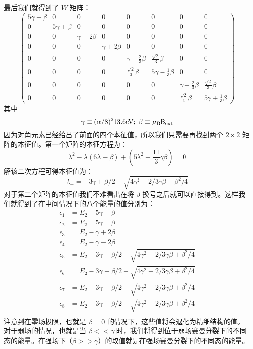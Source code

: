 最后我们就得到了 $W$ 矩阵：
\begin{equation}
\begin{pmatrix}
5\gamma -\beta & 0 & 0 & 0 & 0 & 0 & 0 & 0\\
 0 & 5\gamma +\beta  & 0 & 0 & 0 & 0 & 0 & 0\\
 0 & 0 & \gamma-2\beta & 0 & 0 & 0 & 0 & 0\\
 0 & 0 & 0 & \gamma+2\beta & 0 & 0 & 0 & 0\\
 0 & 0 & 0 & 0 & \gamma-\frac{2}{3}\beta & \frac{\sqrt{2}}{3}\beta& 0 & 0\\
 0 & 0 & 0 & 0 & \frac{\sqrt{2}}{3}\beta & 5\gamma -\frac{1}{3}\beta & 0 & 0\\
 0 & 0 & 0 & 0 & 0 & 0 & \gamma+\frac{2}{3}\beta &\frac{\sqrt{2}}{3}\beta \\
 0 & 0 & 0 & 0 & 0 & 0 & \frac{\sqrt{2}}{3}\beta & 5\gamma +\frac{1}{3}\beta
\end{pmatrix}
\end{equation}
其中
\begin{equation}
\gamma\equiv(\alpha/8)^2 13.6\rm{eV}; \ \beta\equiv\mu_B B_{\rm{ext}}
\end{equation}
因为对角元素已经给出了前面的四个本征值，所以我们只需要再找到两个 $2\times2$ 矩阵的本征值。第一个矩阵的本征方程为：
\begin{equation}
\lambda^2-\lambda(6\lambda-\beta)+(5\lambda^2-\frac{11}{3}\gamma\beta)=0
\end{equation}
解该二次方程可得本征值为：
\begin{equation}
\lambda_\pm = -3\gamma +\beta/2\pm \sqrt{4\gamma^2+2/3\gamma\beta+\beta^2/4}
\end{equation}
对于第二个矩阵的本征值我们不难看出在将 $\beta$ 换号之后就可以直接得到。这样我们就得到了在中间情况下的八个能量的值分别为：
\begin{align}
\epsilon_1 &= E_2-5\gamma+\beta\\
\epsilon_2 &= E_2-5\gamma+\beta\\
\epsilon_3 &= E_2-\gamma+2\beta\\
\epsilon_4 &= E_2-\gamma-2\beta\\
\epsilon_5 &= E_2-3\gamma +\beta/2+\sqrt{4\gamma^2+2/3\gamma\beta+\beta^2/4}\\
\epsilon_6 &= E_2-3\gamma +\beta/2-\sqrt{4\gamma^2+2/3\gamma\beta+\beta^2/4}\\
\epsilon_7 &= E_2-3\gamma -\beta/2+\sqrt{4\gamma^2-2/3\gamma\beta+\beta^2/4}\\
\epsilon_8 &= E_2-3\gamma -\beta/2-\sqrt{4\gamma^2-2/3\gamma\beta+\beta^2/4}\\
\end{align}
注意到在零场极限，也就是 $\beta=0$ 的情况下，这些值将会退化为精细结构的值。对于弱场的情况，也就是当 $\beta<<\gamma$ 时，我们将得到位于弱场赛曼分裂下的不同态的能量。在强场下（$\beta>>\gamma$）的取值就是在强场赛曼分裂下的不同态的能量。



